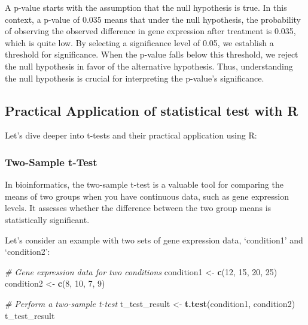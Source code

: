\documentclass[
]{book}
\newenvironment{Shaded}{\begin{snugshade}}{\end{snugshade}}
\newcommand{\CommentTok}[1]{\textcolor[rgb]{0.56,0.35,0.01}{\textit{#1}}}
\newcommand{\DecValTok}[1]{\textcolor[rgb]{0.00,0.00,0.81}{#1}}
\newcommand{\FunctionTok}[1]{\textcolor[rgb]{0.13,0.29,0.53}{\textbf{#1}}}
\newcommand{\NormalTok}[1]{#1}
\newcommand{\OtherTok}[1]{\textcolor[rgb]{0.56,0.35,0.01}{#1}}
\begin{document}
A p-value starts with the assumption that the null hypothesis is true. In this context, a p-value of 0.035 means that under the null hypothesis, the probability of observing the observed difference in gene expression after treatment is 0.035, which is quite low. By selecting a significance level of 0.05, we establish a threshold for significance. When the p-value falls below this threshold, we reject the null hypothesis in favor of the alternative hypothesis. Thus, understanding the null hypothesis is crucial for interpreting the p-value's significance.

\hypertarget{practical-application-of-statistical-test-with-r}{%
\subsection{Practical Application of statistical test with R}\label{practical-application-of-statistical-test-with-r}}

Let's dive deeper into t-tests and their practical application using R:

\hypertarget{two-sample-t-test}{%
\subsubsection{Two-Sample t-Test}\label{two-sample-t-test}}

In bioinformatics, the two-sample t-test is a valuable tool for comparing the means of two groups when you have continuous data, such as gene expression levels. It assesses whether the difference between the two group means is statistically significant.

Let's consider an example with two sets of gene expression data, `condition1' and `condition2':

\begin{Shaded}
\begin{Highlighting}[]
\CommentTok{\# Gene expression data for two conditions}
\NormalTok{condition1 }\OtherTok{\textless{}{-}} \FunctionTok{c}\NormalTok{(}\DecValTok{12}\NormalTok{, }\DecValTok{15}\NormalTok{, }\DecValTok{20}\NormalTok{, }\DecValTok{25}\NormalTok{)}
\NormalTok{condition2 }\OtherTok{\textless{}{-}} \FunctionTok{c}\NormalTok{(}\DecValTok{8}\NormalTok{, }\DecValTok{10}\NormalTok{, }\DecValTok{7}\NormalTok{, }\DecValTok{9}\NormalTok{)}

\CommentTok{\# Perform a two{-}sample t{-}test}
\NormalTok{t\_test\_result }\OtherTok{\textless{}{-}} \FunctionTok{t.test}\NormalTok{(condition1, condition2)}
\NormalTok{t\_test\_result}
\end{Highlighting}
\end{Shaded}
\end{document}
